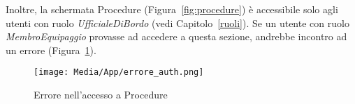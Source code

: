 \noindent
Inoltre, la schermata Procedure (Figura~\ref{fig:procedure}) è accessibile solo agli utenti con ruolo \textit{UfficialeDiBordo} (vedi Capitolo~\ref{ruoli}). Se un utente con ruolo \textit{MembroEquipaggio} provasse ad accedere a questa sezione, andrebbe incontro ad un errore (Figura~\ref{fig:errore_atuh}).

\begin{figure}[ht!]
    \centering
    \texttt{[image: Media/App/errore\_auth.png]}
    \caption{Errore nell'accesso a Procedure}
    \label{fig:errore_atuh}
\end{figure}



